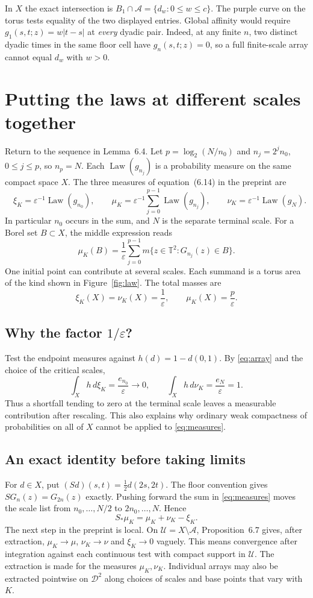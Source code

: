\documentclass[11pt,a4paper]{article}
\newcommand{\T}{\mathbb{T}}
\newcommand{\D}{\mathcal{D}}
\newcommand{\A}{\mathcal{A}}
\newcommand{\U}{\mathcal{U}}
\DeclareMathOperator{\Law}{Law}
\begin{document}
In $X$ the exact intersection is $B_1\cap\A=\{d_w:0\le w\le c\}$. The purple
curve on the torus tests equality of the two displayed entries. Global affinity
would require $g_1(s,t;z)=w|t-s|$ at \emph{every} dyadic pair. Indeed, at any
finite $n$, two distinct dyadic times in the same floor cell have $g_n(s,t;z)=0$,
so a full finite-scale array cannot equal $d_w$ with $w>0$.

\newpage
\section{Putting the laws at different scales together}
Return to the sequence in Lemma~6.4. Let $p=\log_2(N/n_0)$ and
$n_j=2^j n_0$, $0\le j\le p$, so $n_p=N$. Each $\Law(g_{n_j})$ is a
probability measure on the same compact space $X$. The three measures of
equation~(6.14) in the preprint are
\begin{equation}\label{eq:measures}
 \boxed{\quad
 \xi_K=\varepsilon^{-1}\Law(g_{n_0}),\qquad
 \mu_K=\varepsilon^{-1}\sum_{j=0}^{p-1}\Law(g_{n_j}),\qquad
 \nu_K=\varepsilon^{-1}\Law(g_N).\quad}
\end{equation}
In particular $n_0$ occurs in the sum, and $N$ is the separate terminal scale.
For a Borel set $B\subset X$, the middle expression reads
\[
 \mu_K(B)=\frac{1}{\varepsilon}\sum_{j=0}^{p-1}
                 m\{z\in\T^2:G_{n_j}(z)\in B\}.
\]
One initial point can contribute at several scales. Each summand is a torus
area of the kind shown in Figure~\ref{fig:law}. The total masses are
\[
 \xi_K(X)=\nu_K(X)=\frac1{\varepsilon},\qquad \mu_K(X)=\frac{p}{\varepsilon}.
\]

\subsection*{Why the factor $1/\varepsilon$?}
Test the endpoint measures against $h(d)=1-d(0,1)$. By \eqref{eq:array} and
the choice of the critical scales,
\[
 \int_X h\,d\xi_K=\frac{e_{n_0}}{\varepsilon}\longrightarrow0,\qquad
 \int_X h\,d\nu_K=\frac{e_N}{\varepsilon}=1 .
\]
Thus a shortfall tending to zero at the terminal scale leaves a measurable
contribution after rescaling. This also explains why ordinary weak compactness
of probabilities on all of $X$ cannot be applied to \eqref{eq:measures}.

\subsection*{An exact identity before taking limits}
For $d\in X$, put $(Sd)(s,t)=\tfrac12d(2s,2t)$. The floor convention gives
$S G_n(z)=G_{2n}(z)$ exactly. Pushing forward the sum in \eqref{eq:measures}
moves the scale list from $n_0,\ldots,N/2$ to $2n_0,\ldots,N$. Hence
\[
 \boxed{\qquad S_*\mu_K=\mu_K+\nu_K-\xi_K.\qquad}
\]
The next step in the preprint is local. On $\U=X\setminus\A$, Proposition~6.7
gives, after extraction, $\mu_K\to\mu$, $\nu_K\to\nu$ and $\xi_K\to0$ vaguely.
This means convergence after integration against each continuous test with
compact support in $\U$. The extraction is made for the measures $\mu_K,\nu_K$.
Individual arrays may also be extracted pointwise on $\D^2$ along choices
of scales and base points that vary with $K$.
\end{document}
